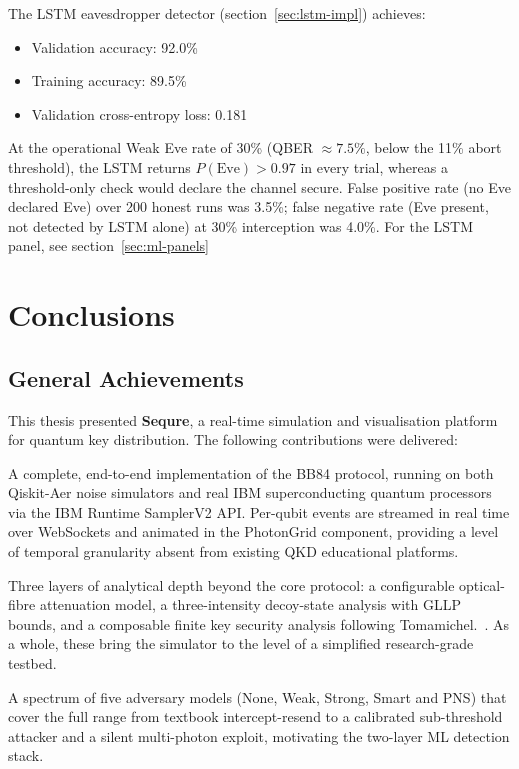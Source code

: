 \documentclass[12pt, a4paper]{article}
\begin{document}
The LSTM eavesdropper detector (section~\ref{sec:lstm-impl}) achieves:
\begin{itemize}
  \item Validation accuracy: 92.0\%
  \item Training accuracy: 89.5\%
  \item Validation cross-entropy loss: 0.181
\end{itemize}

At the operational Weak Eve rate of 30\% (QBER $\approx 7.5\%$, below
the 11\% abort threshold), the LSTM returns $P(\text{Eve}) > 0.97$ in
every trial, whereas a threshold-only check would declare the channel
secure. False positive rate (no Eve declared Eve) over 200 honest runs
was 3.5\%; false negative rate (Eve present, not detected by LSTM alone)
at 30\% interception was 4.0\%.
For the LSTM panel, see section~\ref{sec:ml-panels}
 



\newpage
\section{Conclusions}
\label{sec:conclusions}

\subsection{General Achievements}
\label{sec:achievements}

This thesis presented \textbf{Sequre}, a real-time simulation and
visualisation platform for quantum key distribution. The following
contributions were delivered:

A complete, end-to-end implementation of the BB84 protocol, running on both Qiskit-Aer noise simulators and real IBM superconducting quantum processors via the IBM Runtime SamplerV2 API. Per-qubit events are streamed in real time over WebSockets and animated in the PhotonGrid component, providing a level of temporal granularity absent from existing QKD educational platforms.

Three layers of analytical depth beyond the core protocol: a configurable
optical-fibre attenuation model, a three-intensity decoy-state analysis with
GLLP bounds, and a composable finite key security analysis following
Tomamichel.~\cite{tomamichel2012}. As a whole, these bring the
simulator to the level of a simplified research-grade testbed.

A spectrum of five adversary models (None, Weak, Strong, Smart and PNS)
that cover the full range from textbook intercept-resend to a calibrated
sub-threshold attacker and a silent multi-photon exploit, motivating the
two-layer ML detection stack.
\end{document}
